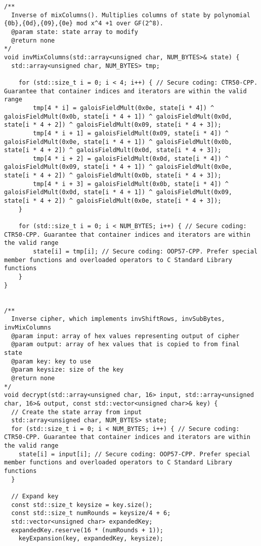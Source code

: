 \documentclass[a4paper,12pt]{article}
\begin{document}
{\begin{lstlisting}
/**
  Inverse of mixColumns(). Multiplies columns of state by polynomial {0b},{0d},{09},{0e} mod x^4 +1 over GF(2^8).
  @param state: state array to modify
  @return none
*/
void invMixColumns(std::array<unsigned char, NUM_BYTES>& state) {
  std::array<unsigned char, NUM_BYTES> tmp;

	for (std::size_t i = 0; i < 4; i++) { // Secure coding: CTR50-CPP. Guarantee that container indices and iterators are within the valid range
		tmp[4 * i] = galoisFieldMult(0x0e, state[i * 4]) ^ galoisFieldMult(0x0b, state[i * 4 + 1]) ^ galoisFieldMult(0x0d, state[i * 4 + 2]) ^ galoisFieldMult(0x09, state[i * 4 + 3]);
		tmp[4 * i + 1] = galoisFieldMult(0x09, state[i * 4]) ^ galoisFieldMult(0x0e, state[i * 4 + 1]) ^ galoisFieldMult(0x0b, state[i * 4 + 2]) ^ galoisFieldMult(0x0d, state[i * 4 + 3]);
		tmp[4 * i + 2] = galoisFieldMult(0x0d, state[i * 4]) ^ galoisFieldMult(0x09, state[i * 4 + 1]) ^ galoisFieldMult(0x0e, state[i * 4 + 2]) ^ galoisFieldMult(0x0b, state[i * 4 + 3]);
		tmp[4 * i + 3] = galoisFieldMult(0x0b, state[i * 4]) ^ galoisFieldMult(0x0d, state[i * 4 + 1]) ^ galoisFieldMult(0x09, state[i * 4 + 2]) ^ galoisFieldMult(0x0e, state[i * 4 + 3]);
	}

	for (std::size_t i = 0; i < NUM_BYTES; i++) { // Secure coding: CTR50-CPP. Guarantee that container indices and iterators are within the valid range
		state[i] = tmp[i]; // Secure coding: OOP57-CPP. Prefer special member functions and overloaded operators to C Standard Library functions
	}
}


/**
  Inverse cipher, which implements invShiftRows, invSubBytes, invMixColumns
  @param input: array of hex values representing output of cipher
  @param output: array of hex values that is copied to from final state
  @param key: key to use
  @param keysize: size of the key
  @return none
*/
void decrypt(std::array<unsigned char, 16> input, std::array<unsigned char, 16>& output, const std::vector<unsigned char>& key) {
  // Create the state array from input
  std::array<unsigned char, NUM_BYTES> state;
  for (std::size_t i = 0; i < NUM_BYTES; i++) { // Secure coding: CTR50-CPP. Guarantee that container indices and iterators are within the valid range
    state[i] = input[i]; // Secure coding: OOP57-CPP. Prefer special member functions and overloaded operators to C Standard Library functions
  }

  // Expand key
  const std::size_t keysize = key.size();
  const std::size_t numRounds = keysize/4 + 6;
  std::vector<unsigned char> expandedKey;
  expandedKey.reserve(16 * (numRounds + 1)); 
	keyExpansion(key, expandedKey, keysize);


\end{lstlisting}}
\end{document}
